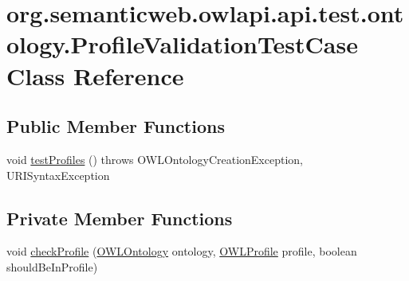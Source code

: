 \hypertarget{classorg_1_1semanticweb_1_1owlapi_1_1api_1_1test_1_1ontology_1_1_profile_validation_test_case}{\section{org.\-semanticweb.\-owlapi.\-api.\-test.\-ontology.\-Profile\-Validation\-Test\-Case Class Reference}
\label{classorg_1_1semanticweb_1_1owlapi_1_1api_1_1test_1_1ontology_1_1_profile_validation_test_case}
}
\subsection*{Public Member Functions}
\begin{DoxyCompactItemize}
\item 
void \hyperlink{classorg_1_1semanticweb_1_1owlapi_1_1api_1_1test_1_1ontology_1_1_profile_validation_test_case_a02c63c4a7a2c07ceb7021916f75c5b04}{test\-Profiles} ()  throws O\-W\-L\-Ontology\-Creation\-Exception, U\-R\-I\-Syntax\-Exception 
\end{DoxyCompactItemize}
\subsection*{Private Member Functions}
\begin{DoxyCompactItemize}
\item 
void \hyperlink{classorg_1_1semanticweb_1_1owlapi_1_1api_1_1test_1_1ontology_1_1_profile_validation_test_case_a8ad981a4406bb703dc6775898598b58b}{check\-Profile} (\hyperlink{interfaceorg_1_1semanticweb_1_1owlapi_1_1model_1_1_o_w_l_ontology}{O\-W\-L\-Ontology} ontology, \hyperlink{interfaceorg_1_1semanticweb_1_1owlapi_1_1profiles_1_1_o_w_l_profile}{O\-W\-L\-Profile} profile, boolean should\-Be\-In\-Profile)
\end{DoxyCompactItemize}
